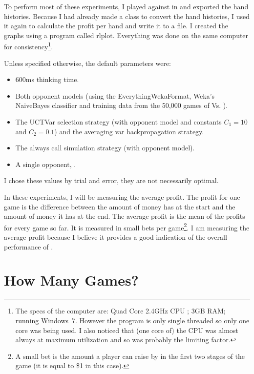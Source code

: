 To perform most of these experiments, I played \mbt against \sbt in \pap and exported the hand histories. Because I had already made a class to convert the hand histories, I used it again to calculate the profit per hand and write it to a file. I created the graphs using a program called rlplot. Everything was done on the same computer for consistency\footnote{The specs of the computer are: Quad Core 2.4GHz CPU ; 3GB RAM; running Windows~7. However the program is only single threaded so only one core was being used. I also noticed that (one core of) the CPU was almost always at maximum utilization and so was probably the limiting factor.}.

Unless specified otherwise, the default parameters were:
\begin{itemize}
\item 600ms thinking time.
\item Both opponent models (using the EverythingWekaFormat, Weka's NaiveBayes classifier and training data from the 50,000 games of \sbt Vs. \sbt).
\item The UCTVar selection strategy (with opponent model and constants \mbox{\(C_1 = 10\)} and \(C_2 = 0.1\)) and the averaging var backpropagation strategy.
\item The always call simulation strategy (with opponent model).
\item A single opponent, \sbt.
\end{itemize}

I chose these values by trial and error, they are not necessarily optimal.

In these experiments, I will be measuring the average profit. The profit for one game is the difference between the amount of money \mbt has at the start and the amount of money it has at the end. The average profit is the mean of the profits for every game so far. It is measured in small bets per game\footnote{A small bet is the amount a player can raise by in the first two stages of the game (it is equal to \$1 in this case).}. I am measuring the average profit because I believe it provides a good indication of the overall performance of \mbt. 



\section{How Many Games?}						%



